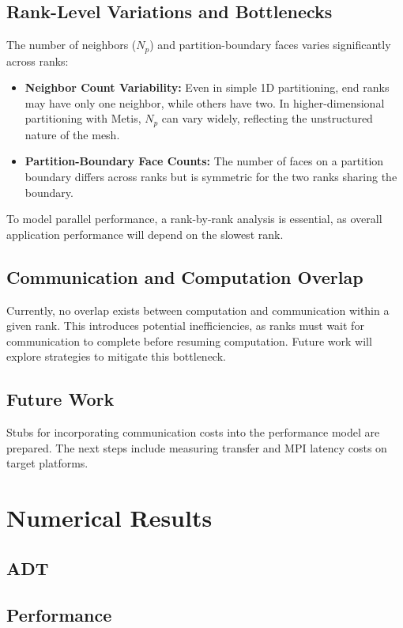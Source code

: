 \documentclass[11pt]{article}
\begin{document}
\subsection{Rank-Level Variations and Bottlenecks}
The number of neighbors (\( N_p \)) and partition-boundary faces varies significantly across ranks:
\begin{itemize}
    \item \textbf{Neighbor Count Variability:} Even in simple 1D partitioning, end ranks may have only one neighbor, while others have two. In higher-dimensional partitioning with Metis, \( N_p \) can vary widely, reflecting the unstructured nature of the mesh.
    \item \textbf{Partition-Boundary Face Counts:} The number of faces on a partition boundary differs across ranks but is symmetric for the two ranks sharing the boundary.
\end{itemize}

To model parallel performance, a rank-by-rank analysis is essential, as overall application performance will depend on the slowest rank.

\subsection{Communication and Computation Overlap}
Currently, no overlap exists between computation and communication within a given rank. This introduces potential inefficiencies, as ranks must wait for communication to complete before resuming computation. Future work will explore strategies to mitigate this bottleneck.

\subsection{Future Work}
Stubs for incorporating communication costs into the performance model are prepared. The next steps include measuring transfer and MPI latency costs on target platforms.

\section{Numerical Results}
\subsection{ADT}
\subsection{Performance}
\end{document}
